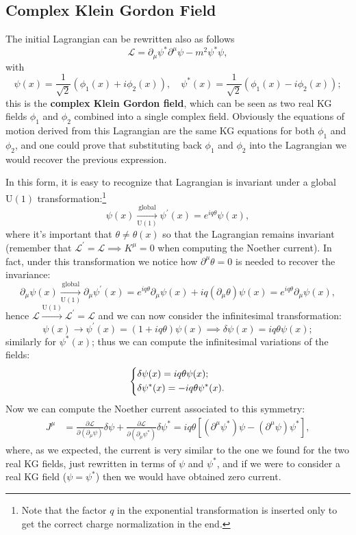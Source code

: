 \subsection{Complex Klein Gordon Field}

The initial Lagrangian can be rewritten also as follows
\[
    \mathcal{L} =\partial_\mu \psi^* \partial^{\mu} \psi - m^2 \psi^* \psi,
\]
with
\[
    \psi(x) = \frac{1}{\sqrt{2}}(\phi_1(x)+i \phi_2(x)), \quad \psi^*(x) = \frac{1}{\sqrt{2}}(\phi_1(x)-i \phi_2(x));
\]
this is the \textbf{complex Klein Gordon field}, which can be seen as two real KG fields \(\phi_1\) and \(\phi_2\) combined into a single complex field. Obviously the equations of motion derived from this Lagrangian are the same KG equations for both \(\phi_1\) and \(\phi_2\), and one could prove that substituting back \(\phi_1\) and \(\phi_2\) into the Lagrangian we would recover the previous expression.

In this form, it is easy to recognize that Lagrangian is invariant under a global \(\mathrm{U}(1)\) transformation:\footnote{Note that the factor \(q\) in the exponential transformation is inserted only to get the correct charge normalization in the end.}
\[
    \psi(x) \xrightarrow[\mathrm{U}(1)]{\text{global}} \psi^{\prime}(x) = e^{i q\theta} \psi(x),
\]
where it's important that \(\theta \neq \theta(x)\) so that the Lagrangian remains invariant (remember that \(\mathcal{L}^{\prime} = \mathcal{L} \implies K^{\mu} = 0\) when computing the Noether current). In fact, under this transformation we notice how \(\partial^{\mu} \theta= 0\) is needed to recover the invariance:
\[
    \partial_\mu \psi(x) \xrightarrow[\mathrm{U}(1)]{\text{global}} \partial_\mu \psi^{\prime}(x) = e^{i q \theta} \partial_\mu \psi(x) + i q (\partial_\mu \theta) \psi(x) = e^{i q \theta} \partial_\mu \psi(x),
\]
hence \(\mathcal{L} \xrightarrow{\mathrm{U}(1)} \mathcal{L} ^{\prime} =\mathcal{L}\) and we can now consider the infinitesimal transformation:
\[
    \psi(x) \to \psi^{\prime}(x) = (1 + i q \theta) \psi(x) \implies \delta \psi(x) = i q \theta \psi(x);
\]
similarly for \(\psi^*(x)\); thus we can compute the infinitesimal variations of the fields:
\[
    \begin{dcases}
        \delta \psi(x)   = i q \theta \psi(x); \\
        \delta \psi^*(x) = -i q \theta \psi^*(x).
    \end{dcases}
\]
Now we can compute the Noether current associated to this symmetry:
\[
    \begin{aligned}
        J^{\mu} & = \frac{\partial \mathcal{L}}{\partial (\partial_{\mu} \psi)} \delta \psi + \frac{\partial \mathcal{L}}{\partial (\partial_{\mu} \psi^*)} \delta \psi^* = i q \theta [(\partial^{\mu} \psi^*) \psi - (\partial^{\mu} \psi) \psi^*],
    \end{aligned}
\]
where, as we expected, the current is very similar to the one we found for the two real KG fields, just rewritten in terms of \(\psi\) and \(\psi^*\), and if we were to consider a real KG field (\(\psi=\psi^*\)) then we would have obtained zero current.


